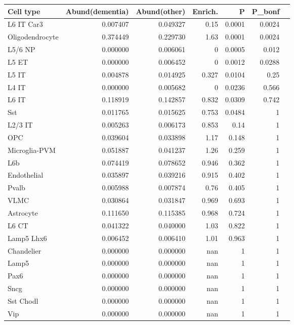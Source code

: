 \begin{tabular}{lrrrrrl}
\toprule
\bfseries Cell type & \bfseries Abund(dementia) & \bfseries Abund(other) & \bfseries Enrich. & \bfseries P & \bfseries P_{bonf} &  \\
\midrule
L6 IT Car3 & 0.007407 & 0.049327 & 0.15 & 0.0001 & 0.0024 &  \\
Oligodendrocyte & 0.374449 & 0.229730 & 1.63 & 0.0001 & 0.0024 &  \\
L5/6 NP & 0.000000 & 0.006061 & 0 & 0.0005 & 0.012 &  \\
L5 ET & 0.000000 & 0.006452 & 0 & 0.0012 & 0.0288 &  \\
L5 IT & 0.004878 & 0.014925 & 0.327 & 0.0104 & 0.25 &  \\
L4 IT & 0.000000 & 0.005682 & 0 & 0.0236 & 0.566 &  \\
L6 IT & 0.118919 & 0.142857 & 0.832 & 0.0309 & 0.742 &  \\
Sst & 0.011765 & 0.015625 & 0.753 & 0.0484 & 1 &  \\
L2/3 IT & 0.005263 & 0.006173 & 0.853 & 0.14 & 1 &  \\
OPC & 0.039604 & 0.033898 & 1.17 & 0.148 & 1 &  \\
Microglia-PVM & 0.051887 & 0.041237 & 1.26 & 0.259 & 1 &  \\
L6b & 0.074419 & 0.078652 & 0.946 & 0.362 & 1 &  \\
Endothelial & 0.035897 & 0.039216 & 0.915 & 0.402 & 1 &  \\
Pvalb & 0.005988 & 0.007874 & 0.76 & 0.405 & 1 &  \\
VLMC & 0.030864 & 0.031847 & 0.969 & 0.693 & 1 &  \\
Astrocyte & 0.111650 & 0.115385 & 0.968 & 0.724 & 1 &  \\
L6 CT & 0.041322 & 0.040000 & 1.03 & 0.822 & 1 &  \\
Lamp5 Lhx6 & 0.006452 & 0.006410 & 1.01 & 0.963 & 1 &  \\
Chandelier & 0.000000 & 0.000000 & nan & 1 & 1 &  \\
Lamp5 & 0.000000 & 0.000000 & nan & 1 & 1 &  \\
Pax6 & 0.000000 & 0.000000 & nan & 1 & 1 &  \\
Sncg & 0.000000 & 0.000000 & nan & 1 & 1 &  \\
Sst Chodl & 0.000000 & 0.000000 & nan & 1 & 1 &  \\
Vip & 0.000000 & 0.000000 & nan & 1 & 1 &  \\
\bottomrule
\end{tabular}

